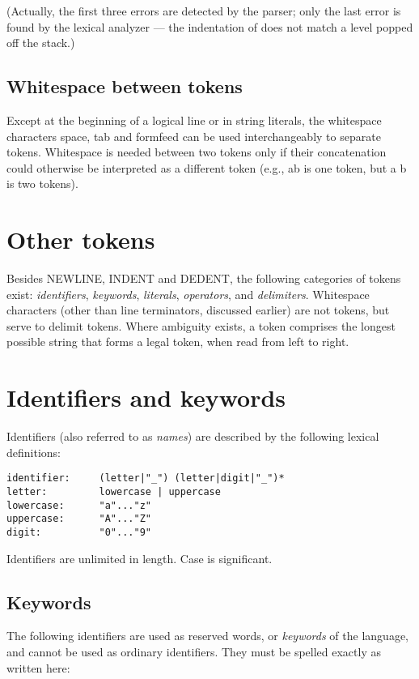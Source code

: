 (Actually, the first three errors are detected by the parser; only the
last error is found by the lexical analyzer --- the indentation of
 does not match a level popped off the stack.)

\subsection{Whitespace between tokens}

Except at the beginning of a logical line or in string literals, the
whitespace characters space, tab and formfeed can be used
interchangeably to separate tokens.  Whitespace is needed between two
tokens only if their concatenation could otherwise be interpreted as a
different token (e.g., ab is one token, but a b is two tokens).

\section{Other tokens}

Besides NEWLINE, INDENT and DEDENT, the following categories of tokens
exist: \emph{identifiers}, \emph{keywords}, \emph{literals},
\emph{operators}, and \emph{delimiters}.
Whitespace characters (other than line terminators, discussed earlier)
are not tokens, but serve to delimit tokens.
Where
ambiguity exists, a token comprises the longest possible string that
forms a legal token, when read from left to right.

\section{Identifiers and keywords}

Identifiers (also referred to as \emph{names}) are described by the following
lexical definitions:

\begin{verbatim}
identifier:     (letter|"_") (letter|digit|"_")*
letter:         lowercase | uppercase
lowercase:      "a"..."z"
uppercase:      "A"..."Z"
digit:          "0"..."9"
\end{verbatim}

Identifiers are unlimited in length.  Case is significant.

\subsection{Keywords}

The following identifiers are used as reserved words, or
\emph{keywords} of the language, and cannot be used as ordinary
identifiers.  They must be spelled exactly as written here:%
%

